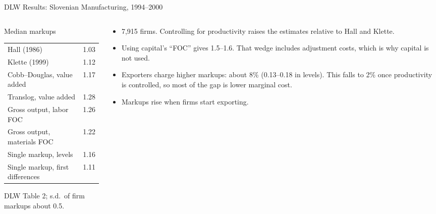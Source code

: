 \documentclass[aspectratio=169,10pt]{beamer}
\begin{document}
\begin{frame}{DLW Results: Slovenian Manufacturing, 1994--2000}
\small
\begin{columns}[T]
\begin{column}{0.44\textwidth}
\begin{center}
\scriptsize
Median markups\par\smallskip
\renewcommand{\arraystretch}{1.1}
\begin{tabular}{lc}
\toprule
Hall (1986) & 1.03 \\
Klette (1999) & 1.12 \\
Cobb--Douglas, value added & 1.17 \\
Translog, value added & 1.28 \\
Gross output, labor FOC & 1.26 \\
Gross output, materials FOC & 1.22 \\
Single markup, levels & 1.16 \\
Single markup, first differences & 1.11 \\
\bottomrule
\end{tabular}

{\tiny DLW Table 2; s.d.\ of firm markups about 0.5.}
\end{center}
\end{column}
\begin{column}{0.54\textwidth}
\begin{itemize}
\item 7,915 firms. Controlling for productivity raises the estimates relative to Hall and Klette.
\item Using capital's ``FOC'' gives 1.5--1.6. That wedge includes adjustment costs, which is why capital is not used.
\item Exporters charge higher markups: about 8\% (0.13--0.18 in levels). This falls to 2\% once productivity is controlled, so most of the gap is lower marginal cost.
\item Markups rise when firms start exporting.
\end{itemize}
\end{column}
\end{columns}
\end{frame}
\end{document}
